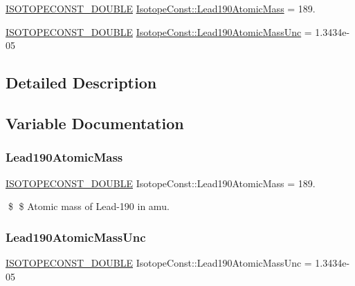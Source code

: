 \begin{DoxyCompactItemize}
\item 
\mbox{\hyperlink{group___isotope_const-_macros_ga8f45a7272ce02c0b4c65c44636ed719a}{I\+S\+O\+T\+O\+P\+E\+C\+O\+N\+S\+T\+\_\+\+D\+O\+U\+B\+LE}} \mbox{\hyperlink{group___isotope_const-_lead-_pb190_gad98707ec76129a981c45308584e5a988}{Isotope\+Const\+::\+Lead190\+Atomic\+Mass}} = 189.
\item 
\mbox{\hyperlink{group___isotope_const-_macros_ga8f45a7272ce02c0b4c65c44636ed719a}{I\+S\+O\+T\+O\+P\+E\+C\+O\+N\+S\+T\+\_\+\+D\+O\+U\+B\+LE}} \mbox{\hyperlink{group___isotope_const-_lead-_pb190_ga72ad53e240f04aec009ec7b6c935a4ff}{Isotope\+Const\+::\+Lead190\+Atomic\+Mass\+Unc}} = 1.\+3434e-\/05
\end{DoxyCompactItemize}


\subsection{Detailed Description}


\subsection{Variable Documentation}
\mbox{\label{group___isotope_const-_lead-_pb190_gad98707ec76129a981c45308584e5a988}} 
\subsubsection{\texorpdfstring{Lead190\+Atomic\+Mass}{Lead190AtomicMass}}
{\footnotesize\ttfamily \mbox{\hyperlink{group___isotope_const-_macros_ga8f45a7272ce02c0b4c65c44636ed719a}{I\+S\+O\+T\+O\+P\+E\+C\+O\+N\+S\+T\+\_\+\+D\+O\+U\+B\+LE}} Isotope\+Const\+::\+Lead190\+Atomic\+Mass = 189.}

\$ \$ Atomic mass of Lead-\/190 in amu. \mbox{\label{group___isotope_const-_lead-_pb190_ga72ad53e240f04aec009ec7b6c935a4ff}} 
\subsubsection{\texorpdfstring{Lead190\+Atomic\+Mass\+Unc}{Lead190AtomicMassUnc}}
{\footnotesize\ttfamily \mbox{\hyperlink{group___isotope_const-_macros_ga8f45a7272ce02c0b4c65c44636ed719a}{I\+S\+O\+T\+O\+P\+E\+C\+O\+N\+S\+T\+\_\+\+D\+O\+U\+B\+LE}} Isotope\+Const\+::\+Lead190\+Atomic\+Mass\+Unc = 1.\+3434e-\/05}

